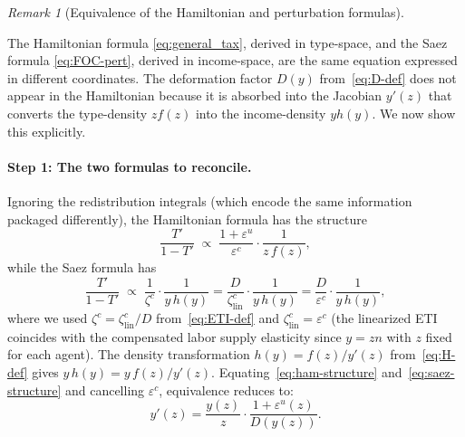 \documentclass[12pt,a4paper]{article}
\theoremstyle{definition}
\theoremstyle{plain}
\theoremstyle{remark}
\newtheorem{remark}{Remark}[section]
\begin{document}
\begin{remark}[Equivalence of the Hamiltonian and perturbation formulas]
  \label{rem:equivalence}
  
  The Hamiltonian formula \eqref{eq:general_tax}, derived in type-space, and the Saez formula \eqref{eq:FOC-pert}, derived in income-space, are the same equation expressed in different coordinates. The deformation factor $D(y)$ from~\eqref{eq:D-def} does not appear in the Hamiltonian because it is absorbed into the Jacobian $y'(z)$ that converts the type-density $zf(z)$ into the income-density $yh(y)$. We now show this explicitly.
  
  \paragraph{Step 1: The two formulas to reconcile.}
  Ignoring the redistribution integrals (which encode the same information packaged differently), the Hamiltonian formula has the structure
  \begin{equation}
  \label{eq:ham-structure}
    \frac{T'}{1-T'} \;\propto\; \frac{1+\varepsilon^u}{\varepsilon^c} \cdot \frac{1}{z\,f(z)},
  \end{equation}
  while the Saez formula has
  \begin{equation}
  \label{eq:saez-structure}
    \frac{T'}{1-T'} \;\propto\; \frac{1}{\zeta^c} \cdot \frac{1}{y\,h(y)}
    = \frac{D}{\zeta^c_{\mathrm{lin}}} \cdot \frac{1}{y\,h(y)}
    = \frac{D}{\varepsilon^c} \cdot \frac{1}{y\,h(y)},
  \end{equation}
  where we used $\zeta^c = \zeta^c_{\mathrm{lin}}/D$ from~\eqref{eq:ETI-def} and $\zeta^c_{\mathrm{lin}} = \varepsilon^c$ (the linearized ETI coincides with the compensated labor supply elasticity since $y = zn$ with $z$ fixed for each agent). The density transformation $h(y) = f(z)/y'(z)$ from~\eqref{eq:H-def} gives $y\,h(y) = y\,f(z)/y'(z)$. Equating~\eqref{eq:ham-structure} and~\eqref{eq:saez-structure} and cancelling $\varepsilon^c$, equivalence reduces to:
  \begin{equation}
  \label{eq:Jacobian-D}
    \boxed{y'(z) = \frac{y(z)}{z} \cdot \frac{1+\varepsilon^u(z)}{D(y(z))}.}
  \end{equation}
  

\end{remark}
\end{document}
